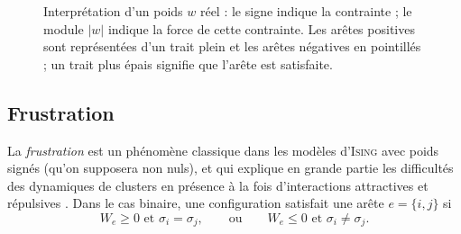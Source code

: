 \begin{figure}[H]
\centering
{}
\caption{Interprétation d'un poids $w$ réel : le signe indique la contrainte ; le module $|w|$ indique la force de cette contrainte. Les arêtes positives sont représentées d'un trait plein et les arêtes négatives en pointillés ; un trait plus épais signifie que l'arête est satisfaite.}
\label{fig:chapII_signed_weight}
\end{figure}

\subsection{Frustration}

La \emph{frustration} \cite{FaiblesseSwendsen-WangFrustration} est un phénomène classique dans les modèles d'\textsc{Ising} avec poids signés \cite{Nishimori2026Mapping} (qu'on supposera non nuls), et qui explique en grande partie les difficultés des dynamiques de clusters en présence à la fois d'interactions attractives et répulsives \cite{KBD1992, FaiblesseSwendsen-WangFrustration}. Dans le cas binaire, une configuration satisfait une arête $e=\{i,j\}$ si
\[
    W_e\ge0\text{ et }\sigma_i=\sigma_j,
    \qquad\text{ou}\qquad
    W_e\le0\text{ et }\sigma_i\neq\sigma_j.
\]

